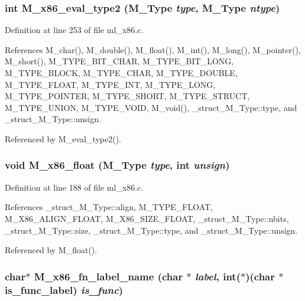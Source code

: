 \subsubsection{\setlength{\rightskip}{0pt plus 5cm}int M\_\-x86\_\-eval\_\-type2 (\bf{M\_\-Type} {\em type}, \bf{M\_\-Type} {\em ntype})}\label{m__x86_8h_f197e50e784711edd9f5b48e06b536f5}




Definition at line 253 of file ml\_\-x86.c.

References M\_\-char(), M\_\-double(), M\_\-float(), M\_\-int(), M\_\-long(), M\_\-pointer(), M\_\-short(), M\_\-TYPE\_\-BIT\_\-CHAR, M\_\-TYPE\_\-BIT\_\-LONG, M\_\-TYPE\_\-BLOCK, M\_\-TYPE\_\-CHAR, M\_\-TYPE\_\-DOUBLE, M\_\-TYPE\_\-FLOAT, M\_\-TYPE\_\-INT, M\_\-TYPE\_\-LONG, M\_\-TYPE\_\-POINTER, M\_\-TYPE\_\-SHORT, M\_\-TYPE\_\-STRUCT, M\_\-TYPE\_\-UNION, M\_\-TYPE\_\-VOID, M\_\-void(), \_\-struct\_\-M\_\-Type::type, and \_\-struct\_\-M\_\-Type::unsign.

Referenced by M\_\-eval\_\-type2().
\subsubsection{\setlength{\rightskip}{0pt plus 5cm}void M\_\-x86\_\-float (\bf{M\_\-Type} {\em type}, int {\em unsign})}\label{m__x86_8h_25fdc6eaf77548799196a9c31ed8e95b}




Definition at line 188 of file ml\_\-x86.c.

References \_\-struct\_\-M\_\-Type::align, M\_\-TYPE\_\-FLOAT, M\_\-X86\_\-ALIGN\_\-FLOAT, M\_\-X86\_\-SIZE\_\-FLOAT, \_\-struct\_\-M\_\-Type::nbits, \_\-struct\_\-M\_\-Type::size, \_\-struct\_\-M\_\-Type::type, and \_\-struct\_\-M\_\-Type::unsign.

Referenced by M\_\-float().
\subsubsection{\setlength{\rightskip}{0pt plus 5cm}char$\ast$ M\_\-x86\_\-fn\_\-label\_\-name (char $\ast$ {\em label}, int($\ast$)(char $\ast$is\_\-func\_\-label) {\em is\_\-func})}\label{m__x86_8h_96ddee6be867fa3306d664e213890a41}





